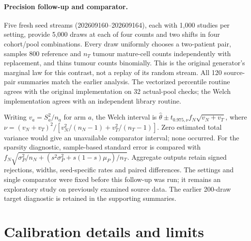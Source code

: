 \appendix


\paragraph{Precision follow-up and comparator.}\label{app:precision}
Five fresh seed streams (202609160--202609164), each with 1{,}000 studies
per setting, provide 5{,}000 draws at each of four counts and two shifts in
four cohort/pool combinations. Every draw uniformly chooses a two-patient
pair, samples 800 reference and $n_T$ tumour mature-cell counts independently
with replacement, and thins tumour counts binomially. This is the original
generator's marginal law for this contrast, not a replay of its random stream.
All 120 source-pair summaries match the earlier analysis. The vectorized
percentile routine agrees with the original implementation on 32 actual-pool
checks; the Welch implementation agrees with an independent library routine.

Writing $v_a=S_a^2/n_a$ for arm $a$, the Welch interval is
$\hat\theta\pm t_{0.975,\nu} f_N\sqrt{v_N+v_T}$, where
$\nu=(v_N+v_T)^2/[v_N^2/(n_N-1)+v_T^2/(n_T-1)]$.
Zero estimated total variance would give an unavailable comparator interval;
none occurred. For the sparsity diagnostic, sample-based standard error is
compared with $f_N\sqrt{\sigma_P^2/n_N+
(s^2\sigma_P^2+s(1-s)\mu_P)/n_T}$. Aggregate outputs retain signed
rejections, widths, seed-specific rates and paired differences. The settings
and single comparator were fixed before this follow-up was run; it remains an
exploratory study on previously examined source data. The earlier 200-draw
target diagnostic is retained in the supporting summaries.


\section{Calibration details and limits}
\label{app:gridcaveats}


